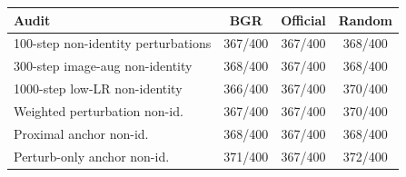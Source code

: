 \begin{tabular}{lccc}
\hline
Audit & BGR & Official & Random \\
\hline
100-step non-identity perturbations & 367/400 & 367/400 & 368/400 \\
300-step image-aug non-identity & 368/400 & 367/400 & 368/400 \\
1000-step low-LR non-identity & 366/400 & 367/400 & 370/400 \\
Weighted perturbation non-id. & 367/400 & 367/400 & 370/400 \\
Proximal anchor non-id. & 368/400 & 367/400 & 368/400 \\
Perturb-only anchor non-id. & 371/400 & 367/400 & 372/400 \\
\hline
\end{tabular}
